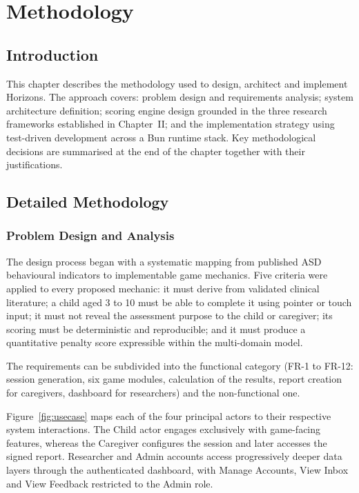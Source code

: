 \documentclass[12pt,a4paper,oneside]{report}
\begin{document}
	\clearpage
	\chapter{Methodology}
	
	\section{Introduction}
	
	This chapter describes the methodology used to design, architect and implement Horizons. The approach covers: problem design and requirements analysis; system architecture definition; scoring engine design grounded in the three research frameworks established in Chapter~II; and the implementation strategy using test-driven development across a Bun runtime stack. Key methodological decisions are summarised at the end of the chapter together with their justifications.
	
	\section{Detailed Methodology}
	
	\subsection{Problem Design and Analysis}
	
	The design process began with a systematic mapping from published ASD behavioural indicators to implementable game mechanics. Five criteria were applied to every proposed mechanic: it must derive from validated clinical literature; a child aged 3 to 10 must be able to complete it using pointer or touch input; it must not reveal the assessment purpose to the child or caregiver; its scoring must be deterministic and reproducible; and it must produce a quantitative penalty score expressible within the multi-domain model.
	
	The requirements can be subdivided into the functional category (FR-1 to FR-12: session generation, six game modules, calculation of the results, report creation for caregivers, dashboard for researchers) and the non-functional one.
	
	Figure~\ref{fig:usecase} maps each of the four principal actors to their respective system interactions. The Child actor engages exclusively with game-facing features, whereas the Caregiver configures the session and later accesses the signed report. Researcher and Admin accounts access progressively deeper data layers through the authenticated dashboard, with Manage Accounts, View Inbox and View Feedback restricted to the Admin role.
	
\end{document}
